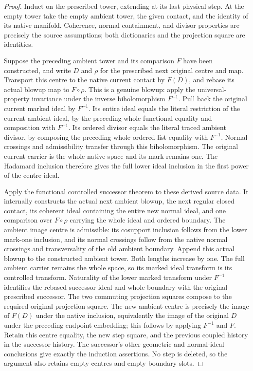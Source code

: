 \begin{proof}
Induct on the prescribed tower, extending at its last physical step. At the
empty tower take the empty ambient tower, the given contact, and the identity
of its native manifold. Coherence, normal containment, and divisor properties
are precisely the source assumptions; both dictionaries and the projection
square are identities.

Suppose the preceding ambient tower and its comparison $F$ have been
constructed, and write $D$ and $\rho$ for the prescribed next original
centre and map. Transport this centre to the native current contact by
$F(D)$, and rebase its actual blowup map to $F\circ\rho$. This is a genuine
blowup: apply the universal-property invariance under the inverse
biholomorphism $F^{-1}$. Pull back the original current marked ideal by
$F^{-1}$. Its entire ideal equals the literal restriction of the current
ambient ideal, by the preceding whole functional equality and composition
with $F^{-1}$. Its ordered divisor equals the literal traced ambient divisor,
by composing the preceding whole ordered-list equality with $F^{-1}$.
Normal crossings and admissibility transfer through this biholomorphism.
The original current carrier is the whole native space and its mark remains
one. The Hadamard inclusion therefore gives the full lower ideal inclusion
in the first power of the centre ideal.

Apply the functional controlled successor theorem to these derived source
data. It internally constructs the actual next ambient blowup, the next
regular closed contact, its coherent ideal containing the entire new normal
ideal, and one comparison over $F\circ\rho$ carrying the whole ideal and
ordered boundary. The ambient image centre is admissible: its cosupport
inclusion follows from the lower mark-one inclusion, and its normal crossings
follow from the native normal crossings and transversality of the old ambient
boundary. Append this actual blowup to the constructed ambient tower. Both
lengths increase by one. The full ambient carrier remains the whole space,
so its marked ideal transform is its controlled transform. Naturality of the
lower marked transform under $F^{-1}$ identifies the rebased successor ideal
and whole boundary with the original prescribed successor. The two commuting
projection squares compose to the required original projection square.
The new ambient centre is precisely the image of $F(D)$ under the native
inclusion, equivalently the image of the original $D$ under the preceding
endpoint embedding; this follows by applying $F^{-1}$ and $F$. Retain this
centre equality, the new step square, and the previous coupled history in
the successor history. The
successor's other geometric and normal-ideal conclusions give exactly the
induction assertions. No step is deleted, so the argument also retains empty
centres and empty boundary slots.
\end{proof}
